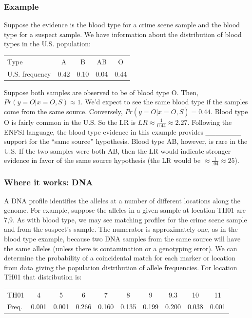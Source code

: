 \documentclass[]{book}
\theoremstyle{definition}
\theoremstyle{definition}
\theoremstyle{remark}
\begin{document}
\subsubsection{Example}\label{example-2}

Suppose the evidence is the blood type for a crime scene sample and the
blood type for a suspect sample. We have information about the
distribution of blood types in the U.S. population:

\begin{tabular}{l|cccc}
Type & A & B & AB & O \\
U.S. frequency & 0.42 & 0.10 & 0.04 & 0.44
\end{tabular}

Suppose both samples are observed to be of blood type O. Then,
\(Pr(y = O|x = O,S) \approx 1\). We'd expect to see the same blood type
if the samples come from the same source. Conversely,
\(Pr(y = O|x = O,\overline{S}) = 0.44\). Blood type O is fairly common
in the U.S. So the LR is \(LR \approx \frac{1}{0.44} \approx 2.27\).
Following the ENFSI language, the blood type evidence in this example
provides \_\_\_\_\_\_\_ support for the ``same source'' hypothesis.
Blood type AB, however, is rare in the U.S. If the two samples were both
AB, then the LR would indicate stronger evidence in favor of the same
source hypothesis (the LR would be
\(\approx \frac{1}{.04} \approx 25\)).

\subsubsection{Where it works: DNA}\label{where-it-works-dna}

A DNA profile identifies the alleles at a number of different locations
along the genome. For example, suppose the alleles in a given sample at
location TH01 are 7,9. As with blood type, we may see matching profiles
for the crime scene sample and from the suspect's sample. The numerator
is approximately one, as in the blood type example, because two DNA
samples from the same source will have the same alleles (unless there is
contamination or a genotyping error). We can determine the probability
of a coincidental match for each marker or location from data giving the
population distribution of allele frequencies. For location TH01 that
distribution is:

\begin{tabular}{lccccccccc}
TH01 & 4 & 5 & 6 & 7 & 8 & 9 & 9.3 & 10 & 11 \\ 
Freq. & 0.001 & 0.001 & 0.266 & 0.160 & 0.135 & 0.199 & 0.200  & 0.038 & 0.001
\end{tabular}
\end{document}
